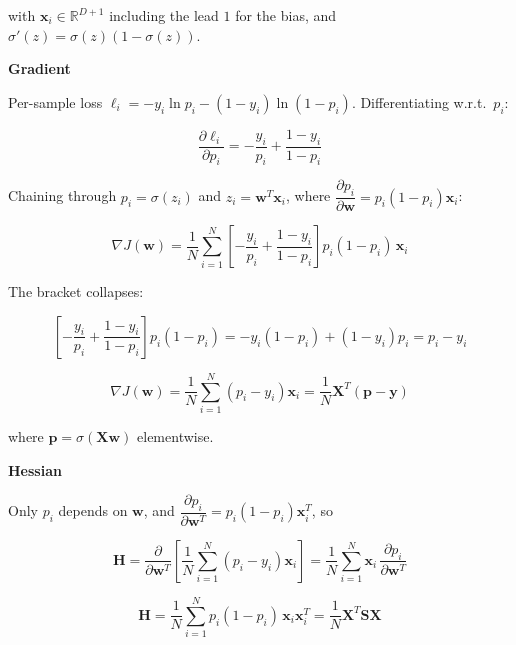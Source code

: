 \documentclass[12pt,a4paper]{article}
\begin{document}
with $\mathbf{x}_i \in \mathbb{R}^{D+1}$ including the lead $1$ for the bias, and
$\sigma'(z) = \sigma(z)(1-\sigma(z))$.

\textbf{Gradient}

Per-sample loss $\ell_i = -y_i\ln p_i - (1-y_i)\ln(1-p_i)$. Differentiating w.r.t.\ $p_i$:

\begin{equation*}
\frac{\partial \ell_i}{\partial p_i} = -\frac{y_i}{p_i} + \frac{1-y_i}{1-p_i}
\end{equation*}

Chaining through $p_i = \sigma(z_i)$ and $z_i = \mathbf{w}^{T}\mathbf{x}_i$, where
$\dfrac{\partial p_i}{\partial\mathbf{w}} = p_i(1-p_i)\mathbf{x}_i$:

\begin{equation*}
\nabla J(\mathbf{w}) = \frac{1}{N}\sum_{i=1}^{N}
\left[-\frac{y_i}{p_i} + \frac{1-y_i}{1-p_i}\right]p_i(1-p_i)\,\mathbf{x}_i
\end{equation*}

The bracket collapses:

\begin{equation*}
\left[-\frac{y_i}{p_i} + \frac{1-y_i}{1-p_i}\right]p_i(1-p_i)
= -y_i(1-p_i) + (1-y_i)p_i = p_i - y_i
\end{equation*}

\begin{equation}
\boxed{\;\nabla J(\mathbf{w}) = \frac{1}{N}\sum_{i=1}^{N}(p_i - y_i)\mathbf{x}_i
= \frac{1}{N}\mathbf{X}^{T}(\mathbf{p} - \mathbf{y})\;}
\label{eq:bcegrad}
\end{equation}

where $\mathbf{p} = \sigma(\mathbf{Xw})$ elementwise.

\textbf{Hessian}

Only $p_i$ depends on $\mathbf{w}$, and
$\dfrac{\partial p_i}{\partial\mathbf{w}^{T}} = p_i(1-p_i)\mathbf{x}_i^{T}$, so

\begin{equation*}
\mathbf{H} = \frac{\partial}{\partial\mathbf{w}^{T}}
\left[\frac{1}{N}\sum_{i=1}^{N}(p_i-y_i)\mathbf{x}_i\right]
= \frac{1}{N}\sum_{i=1}^{N}\mathbf{x}_i\,\frac{\partial p_i}{\partial\mathbf{w}^{T}}
\end{equation*}

\begin{equation}
\boxed{\;\mathbf{H} = \frac{1}{N}\sum_{i=1}^{N}p_i(1-p_i)\,\mathbf{x}_i\mathbf{x}_i^{T}
= \frac{1}{N}\mathbf{X}^{T}\mathbf{S}\mathbf{X}\;}
\label{eq:bcehess}
\end{equation}
\end{document}
